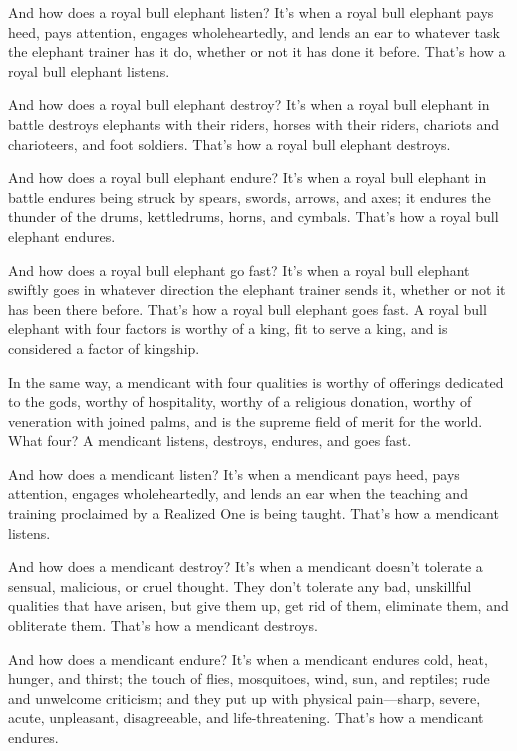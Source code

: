 \documentclass[12pt,openany]{book}%
\begin{document}
And how does a royal bull elephant listen? It’s when a royal bull elephant pays heed, pays attention, engages wholeheartedly, and lends an ear to whatever task the elephant trainer has it do, whether or not it has done it before. That’s how a royal bull elephant listens. 

And how does a royal bull elephant destroy? It’s when a royal bull elephant in battle destroys elephants with their riders, horses with their riders, chariots and charioteers, and foot soldiers. That’s how a royal bull elephant destroys. 

And how does a royal bull elephant endure? It’s when a royal bull elephant in battle endures being struck by spears, swords, arrows, and axes; it endures the thunder of the drums, kettledrums, horns, and cymbals. That’s how a royal bull elephant endures. 

And how does a royal bull elephant go fast? It’s when a royal bull elephant swiftly goes in whatever direction the elephant trainer sends it, whether or not it has been there before. That’s how a royal bull elephant goes fast. A royal bull elephant with four factors is worthy of a king, fit to serve a king, and is considered a factor of kingship. 

In the same way, a mendicant with four qualities is worthy of offerings dedicated to the gods, worthy of hospitality, worthy of a religious donation, worthy of veneration with joined palms, and is the supreme field of merit for the world. What four? A mendicant listens, destroys, endures, and goes fast. 

And how does a mendicant listen? It’s when a mendicant pays heed, pays attention, engages wholeheartedly, and lends an ear when the teaching and training proclaimed by a Realized One is being taught. That’s how a mendicant listens. 

And how does a mendicant destroy? It’s when a mendicant doesn’t tolerate a sensual, malicious, or cruel thought. They don’t tolerate any bad, unskillful qualities that have arisen, but give them up, get rid of them, eliminate them, and obliterate them. That’s how a mendicant destroys. 

And how does a mendicant endure? It’s when a mendicant endures cold, heat, hunger, and thirst; the touch of flies, mosquitoes, wind, sun, and reptiles; rude and unwelcome criticism; and they put up with physical pain—sharp, severe, acute, unpleasant, disagreeable, and life-threatening. That’s how a mendicant endures. 
\end{document}
